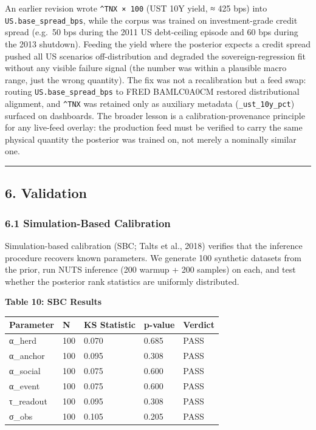 \documentclass[
]{article}
\begin{document}
An earlier revision wrote \texttt{\^{}TNX\ ×\ 100} (UST 10Y yield, ≈ 425
bps) into \texttt{US.base\_spread\_bps}, while the corpus was trained on
investment-grade credit spread (e.g.~50 bps during the 2011 US
debt-ceiling episode and 60 bps during the 2013 shutdown). Feeding the
yield where the posterior expects a credit spread pushed all US
scenarios off-distribution and degraded the sovereign-regression fit
without any visible failure signal (the number was within a plausible
macro range, just the wrong quantity). The fix was not a recalibration
but a feed swap: routing \texttt{US.base\_spread\_bps} to FRED
BAMLC0A0CM restored distributional alignment, and \texttt{\^{}TNX} was
retained only as auxiliary metadata (\texttt{\_ust\_10y\_pct}) surfaced
on dashboards. The broader lesson is a calibration-provenance principle
for any live-feed overlay: the production feed must be verified to carry
the same physical quantity the posterior was trained on, not merely a
nominally similar one.

\begin{center}\rule{0.5\linewidth}{0.5pt}\end{center}

\subsection{6. Validation}\label{validation}

\subsubsection{6.1 Simulation-Based
Calibration}\label{simulation-based-calibration}

Simulation-based calibration (SBC; Talts et al., 2018) verifies that the
inference procedure recovers known parameters. We generate 100 synthetic
datasets from the prior, run NUTS inference (200 warmup + 200 samples)
on each, and test whether the posterior rank statistics are uniformly
distributed.

\textbf{Table 10: SBC Results}

\begin{longtable}[]{@{}lllll@{}}
\toprule\noalign{}
Parameter & N & KS Statistic & p-value & Verdict \\
\midrule\noalign{}
\endhead
\bottomrule\noalign{}
\endlastfoot
α\_herd & 100 & 0.070 & 0.685 & PASS \\
α\_anchor & 100 & 0.095 & 0.308 & PASS \\
α\_social & 100 & 0.075 & 0.600 & PASS \\
α\_event & 100 & 0.075 & 0.600 & PASS \\
τ\_readout & 100 & 0.095 & 0.308 & PASS \\
σ\_obs & 100 & 0.105 & 0.205 & PASS \\
\end{longtable}
\end{document}
